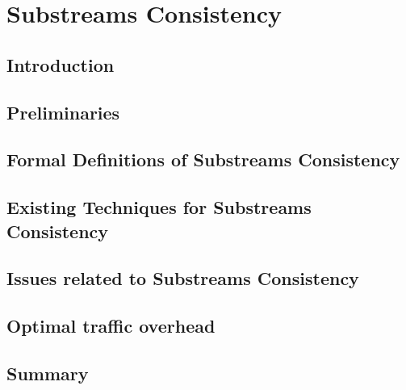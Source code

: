 \chapter{Substreams Consistency}

\section{Introduction}

\section{Preliminaries}

\section{Formal Definitions of Substreams Consistency}

\section{Existing Techniques for Substreams Consistency}

\section{Issues related to Substreams Consistency}

\section{Optimal traffic overhead}

\section{Summary}
